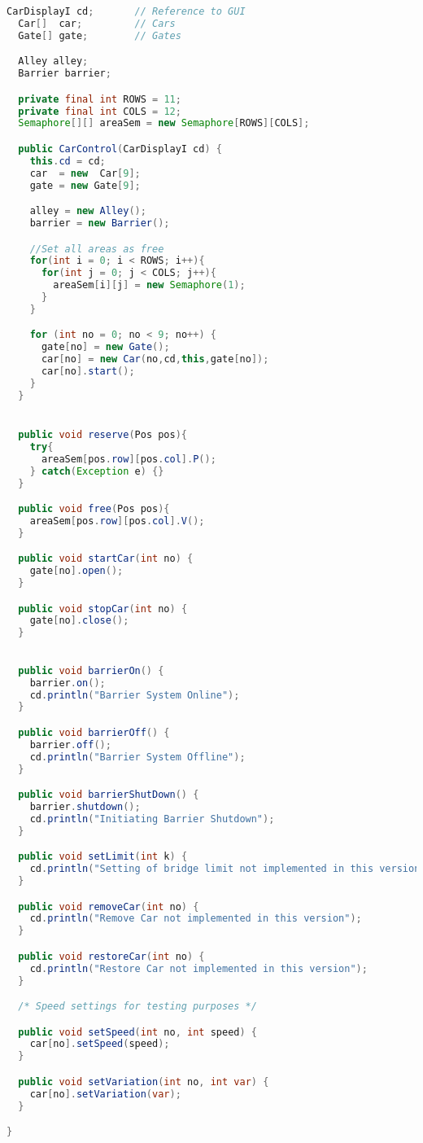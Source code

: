 \begin{lstlisting}[language=java]
  CarDisplayI cd;       // Reference to GUI
  Car[]  car;         // Cars
  Gate[] gate;        // Gates

  Alley alley;
  Barrier barrier;

  private final int ROWS = 11;
  private final int COLS = 12;
  Semaphore[][] areaSem = new Semaphore[ROWS][COLS];

  public CarControl(CarDisplayI cd) {
    this.cd = cd;
    car  = new  Car[9];
    gate = new Gate[9];

    alley = new Alley();
    barrier = new Barrier();

    //Set all areas as free
    for(int i = 0; i < ROWS; i++){
      for(int j = 0; j < COLS; j++){
        areaSem[i][j] = new Semaphore(1);
      }
    }

    for (int no = 0; no < 9; no++) {
      gate[no] = new Gate();
      car[no] = new Car(no,cd,this,gate[no]);
      car[no].start();
    } 
  }


  public void reserve(Pos pos){
    try{
      areaSem[pos.row][pos.col].P();
    } catch(Exception e) {}
  }

  public void free(Pos pos){
    areaSem[pos.row][pos.col].V();
  }

  public void startCar(int no) {
    gate[no].open();
  }

  public void stopCar(int no) {
    gate[no].close();
  }

  
  public void barrierOn() {
    barrier.on();
    cd.println("Barrier System Online");
  }

  public void barrierOff() { 
    barrier.off();
    cd.println("Barrier System Offline");
  }

  public void barrierShutDown() { 
    barrier.shutdown();
    cd.println("Initiating Barrier Shutdown");
  }

  public void setLimit(int k) { 
    cd.println("Setting of bridge limit not implemented in this version");
  }

  public void removeCar(int no) { 
    cd.println("Remove Car not implemented in this version");
  }

  public void restoreCar(int no) { 
    cd.println("Restore Car not implemented in this version");
  }

  /* Speed settings for testing purposes */

  public void setSpeed(int no, int speed) { 
    car[no].setSpeed(speed);
  }

  public void setVariation(int no, int var) { 
    car[no].setVariation(var);
  }

}
\end{lstlisting}